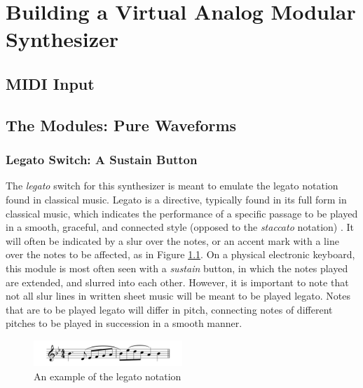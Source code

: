 \chapter[Modular Synthesizer]{Building a Virtual Analog Modular Synthesizer}\label{chapter:building-a-mod-synth}


\section{MIDI Input}\label{section:midi-input}

\section{The Modules: Pure Waveforms}

\subsection{Legato Switch: A Sustain Button}

The \textit{legato} switch for this synthesizer is meant to emulate the legato notation found in classical music. Legato is a directive, typically found in its full form in classical music, which indicates the performance of a specific passage to be played in a smooth, graceful, and connected style (opposed to the \textit{staccato} notation) \cite{Winer_2018}. It will often be indicated by a slur over the notes, or an accent mark with a line over the notes to be affected, as in Figure \ref{fig:legato-example}. On a physical electronic keyboard, this module is most often seen with a \textit{sustain} button, in which the notes played are extended, and slurred into each other. However, it is important to note that not all slur lines in written sheet music will be meant to be played legato. Notes that are to be played legato will differ in pitch, connecting notes of different pitches to be played in succession in a smooth manner. 

\begin{figure}
  \centering
  \includegraphics[width=0.5\textwidth]{figures/legato-example.png}
  \caption{An example of the legato notation}
  \label{fig:legato-example}
\end{figure}

